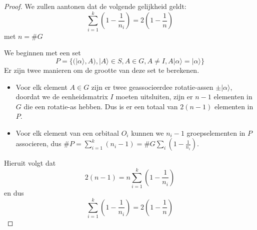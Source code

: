 \begin{proof}
We zullen aantonen dat de volgende gelijkheid geldt:
\[
\sum_{i=1}^{k} \left(1 - \frac{1}{n_i}\right) = 2(1-\frac{1}{n})
\]
met \(n = \#G\)

We beginnen met een set 
\[
P = \{(|\alpha\rangle, A), |A\rangle \in S, A \in G, A \neq I, A|\alpha\rangle = |\alpha\rangle\}
\]
Er zijn twee manieren om de grootte van deze set te berekenen. 
\begin{itemize}
    \item[1.] Voor elk element \(A \in G\) zijn er twee geassocieerdee rotatie-assen \(\pm |\alpha\rangle\),
    doordat we de eenheidsmatrix \(I \) moeten uitsluiten, zijn er \(n-1\) elementen in \(G\) die een rotatie-as hebben. Dus is er een totaal van \(2(n-1)\) elementen in \(P\).
    \item[2.] Voor elk element van een orbitaal \(O_i\) kunnen we \(n_i -1\) groepselementen in \(P\) associeren, 
    dus \(\# P = \sum_{i=1}^{k} (n_i - 1) = \#G \sum_{i}(1-\frac{1}{n_i})\).
\end{itemize}
Hieruit volgt dat
\[2(n-1) = n \sum_{i=1}^{k} (1-\frac{1}{n_i})\]
en dus
\[\sum_{i=1}^{k} (1-\frac{1}{n_i}) = 2(1-\frac{1}{n})\] 
\end{proof}